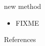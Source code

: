 \documentclass{beamer}
\begin{document}
\begin{frame}{new method}

\begin{itemize}
\item FIXME \cite{BuelerMitchell2022}
\end{itemize}
\end{frame}







\appendix

\begin{frame}{References}
	
	
\end{frame}
\end{document}
